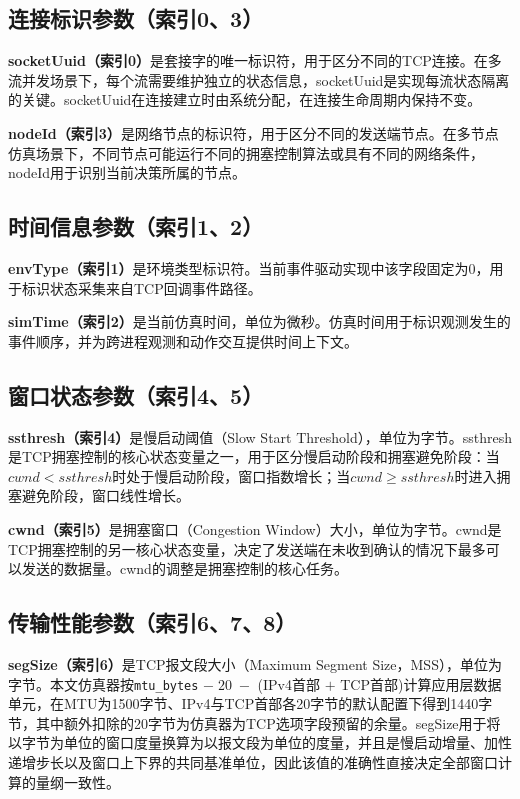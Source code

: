 \subsection{连接标识参数（索引0、3）}

\textbf{socketUuid（索引0）}是套接字的唯一标识符，用于区分不同的TCP连接。在多流并发场景下，每个流需要维护独立的状态信息，socketUuid是实现每流状态隔离的关键。socketUuid在连接建立时由系统分配，在连接生命周期内保持不变。

\textbf{nodeId（索引3）}是网络节点的标识符，用于区分不同的发送端节点。在多节点仿真场景下，不同节点可能运行不同的拥塞控制算法或具有不同的网络条件，nodeId用于识别当前决策所属的节点。

\subsection{时间信息参数（索引1、2）}

\textbf{envType（索引1）}是环境类型标识符。当前事件驱动实现中该字段固定为0，用于标识状态采集来自TCP回调事件路径。

\textbf{simTime（索引2）}是当前仿真时间，单位为微秒。仿真时间用于标识观测发生的事件顺序，并为跨进程观测和动作交互提供时间上下文。

\subsection{窗口状态参数（索引4、5）}

\textbf{ssthresh（索引4）}是慢启动阈值（Slow Start Threshold），单位为字节。ssthresh是TCP拥塞控制的核心状态变量之一，用于区分慢启动阶段和拥塞避免阶段：当$cwnd < ssthresh$时处于慢启动阶段，窗口指数增长；当$cwnd \geq ssthresh$时进入拥塞避免阶段，窗口线性增长。

\textbf{cwnd（索引5）}是拥塞窗口（Congestion Window）大小，单位为字节。cwnd是TCP拥塞控制的另一核心状态变量，决定了发送端在未收到确认的情况下最多可以发送的数据量。cwnd的调整是拥塞控制的核心任务。

\subsection{传输性能参数（索引6、7、8）}

\textbf{segSize（索引6）}是TCP报文段大小（Maximum Segment Size，MSS），单位为字节。本文仿真器按\texttt{mtu\_bytes} $-\;20\;-$ (IPv4首部 $+$ TCP首部)计算应用层数据单元，在MTU为1500字节、IPv4与TCP首部各20字节的默认配置下得到1440字节，其中额外扣除的20字节为仿真器为TCP选项字段预留的余量。segSize用于将以字节为单位的窗口度量换算为以报文段为单位的度量，并且是慢启动增量、加性递增步长以及窗口上下界的共同基准单位，因此该值的准确性直接决定全部窗口计算的量纲一致性。

